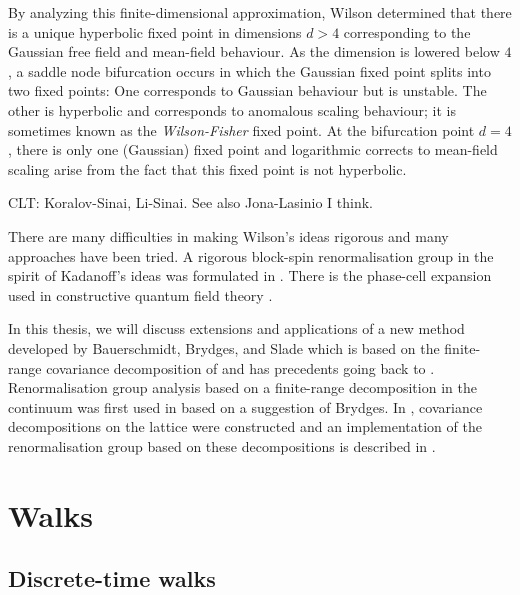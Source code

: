 By analyzing this finite-dimensional approximation, Wilson determined that there
is a unique hyperbolic fixed point in dimensions $d > 4$ corresponding to the Gaussian
free field and mean-field behaviour. As the dimension is lowered below $4$, a saddle
node bifurcation occurs in which the Gaussian fixed point splits into two fixed points:
One corresponds to Gaussian behaviour but is unstable. The other is hyperbolic and
corresponds to anomalous scaling behaviour; it is sometimes known as the
\emph{Wilson-Fisher} fixed point. At the bifurcation point $d = 4$, there is only
one (Gaussian) fixed point and logarithmic corrects to mean-field scaling arise
from the fact that this fixed point is not hyperbolic.

\begin{example}
CLT: Koralov-Sinai, Li-Sinai. See also Jona-Lasinio I think.
\end{example}

There are many difficulties in making Wilson's ideas rigorous and many approaches
have been tried. A rigorous block-spin renormalisation group in the spirit of Kadanoff's
ideas was formulated in \cite{GK85}. There is the phase-cell expansion used in
constructive quantum field theory \cite{GJ87}.

In this thesis, we will discuss extensions and applications of a new method
developed by Bauerschmidt, Brydges, and Slade \REF which is based on the
finite-range covariance decomposition of \cite{Baue13a} and has precedents going back to
\cite{BY90}. Renormalisation group analysis based on a finite-range decomposition
in the continuum was first used in \cite{MS00} based on a suggestion of Brydges.
In \cite{BGM04}, covariance decompositions on the lattice were constructed
and an implementation of the renormalisation group based on these decompositions
is described in \cite{Bryd09}.


\section{Walks}

\subsection{Discrete-time walks}

